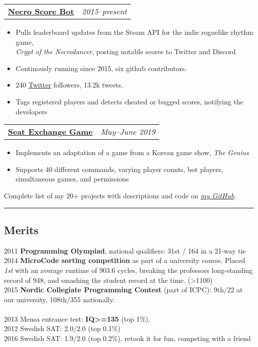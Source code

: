 \documentclass[10pt,letterpaper]{article}
\makeatletter
\newcommand{\headerrow}[2]
{\begin{tabular*}{\linewidth}{l@{\extracolsep{\fill}}r}
    #1 &
    #2 \\
\end{tabular*}}
\makeatother
\begin{document}
\headerrow
{\href{https://github.com/jakkdl/necro\_score\_bot}{\textbf{Necro Score Bot}}}
{\emph{2015--present}}
\begin{itemize}[noitemsep, topsep=1pt]
    \item Pulls leaderboard updates from the Steam API for the indie roguelike
        rhythm game, \\ \emph{Crypt of the Necrodancer}, posting notable scores
        to Twitter and Discord
    \item Continously running since 2015, six github contributors.
    \item 240 \href{(https://twitter.com/necro\_score\_bot}{Twitter} followers, 13.2k tweets.
    \item Tags registered players and detects cheated or bugged scores, notifying the
        developers
\end{itemize}
\vspace{0.5em}
\headerrow
    {\href{https://github.com/jakkdl/seat\_exchange}{\textbf{Seat Exchange Game}}}
    {\emph{May--June 2019}}
\begin{itemize}[noitemsep, topsep=1pt]
    \item Implements an adaptation of a game from a Korean game show, \emph{The
        Genius}
    \item Supports 40 different commands, varying player counts,
        bot players, simultaneous games, and permissions
\end{itemize}

\vspace{0.5em}
Complete list of my 20+ projects with descriptions and code on \href{https://github.com/jakkdl/resume}{\emph{my GitHub}}.

\vspace{1em}
\hrule
\vspace{-0.4em}
\subsection*{Merits}

2011 \textbf{Programming Olympiad}, national qualifiers: 31st / 164 in a 21-way tie \\
2014 \textbf{MicroCode sorting competition} as part of a university course. Placed \emph{1st} with an average runtime of 903.6 cycles, breaking the professors long-standing record of 948, and smashing the student record at the time. (>1100) \\
2015 \textbf{Nordic Collegiate Programming Contest} (part of ICPC): 9th/22 at our university, 108th/355 nationally. \\
\\
2013 Mensa entrance test: \textbf{IQ>=135} (top 1\%). \\
2012 Swedish SAT: 2.0/2.0 (top 0.1\%) \\
2016 Swedish SAT: 1.9/2.0 (top 0.2\%), retook it for fun, competing with a friend
\end{document}

